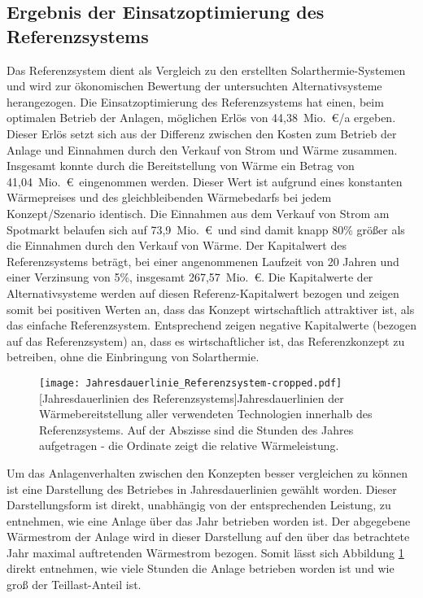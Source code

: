\subsection{Ergebnis der Einsatzoptimierung des Referenzsystems} 
Das Referenzsystem dient als Vergleich zu den erstellten Solarthermie-Systemen und wird zur ökonomischen Bewertung der untersuchten Alternativsysteme herangezogen. Die Einsatzoptimierung des Referenzsystems hat einen, beim optimalen Betrieb der Anlagen, möglichen Erlös von 44,38~Mio.~\euro/a ergeben. Dieser Erlös setzt sich aus der Differenz zwischen den Kosten zum Betrieb der Anlage und Einnahmen durch den Verkauf von Strom und Wärme zusammen. Insgesamt konnte durch die Bereitstellung von Wärme ein Betrag von 41,04~Mio.~\euro\ eingenommen werden. Dieser Wert ist aufgrund eines konstanten Wärmepreises und des gleichbleibenden Wärmebedarfs bei jedem Konzept/Szenario identisch. Die Einnahmen aus dem Verkauf von Strom am Spotmarkt belaufen sich auf 73,9~Mio.~\euro\ und sind damit knapp 80\% größer als die Einnahmen durch den Verkauf von Wärme. Der Kapitalwert des Referenzsystems beträgt, bei einer angenommenen Laufzeit von 20 Jahren und einer Verzinsung von 5\%, insgesamt 267,57~Mio.~\euro. Die Kapitalwerte der Alternativsysteme werden auf diesen Referenz-Kapitalwert bezogen und zeigen somit bei positiven Werten an, dass das Konzept wirtschaftlich attraktiver ist, als das einfache Referenzsystem. Entsprechend zeigen negative Kapitalwerte (bezogen auf das Referenzsystem) an, dass es wirtschaftlicher ist, das Referenzkonzept zu betreiben, ohne die Einbringung von Solarthermie.

	\begin{figure}[ht]
		\centering
		\texttt{[image: Jahresdauerlinie\_Referenzsystem-cropped.pdf]}
		[Jahresdauerlinien des Referenzsystems]{Jahresdauerlinien der Wärmebereitstellung aller verwendeten Technologien innerhalb des Referenzsystems. Auf der Abszisse sind die Stunden des Jahres aufgetragen - die Ordinate zeigt die relative Wärmeleistung.}
		\label{figure: Jahresdauerlinien_Referenzsystem}
	\end{figure}

Um das Anlagenverhalten zwischen den Konzepten besser vergleichen zu können ist eine Darstellung des Betriebes in Jahresdauerlinien gewählt worden. Dieser Darstellungsform ist direkt, unabhängig von der entsprechenden Leistung, zu entnehmen, wie eine Anlage über das Jahr betrieben worden ist. Der abgegebene Wärmestrom der Anlage wird in dieser Darstellung auf den über das betrachtete Jahr maximal auftretenden Wärmestrom bezogen. Somit lässt sich Abbildung \ref{figure: Jahresdauerlinien_Referenzsystem} direkt entnehmen, wie viele Stunden die Anlage betrieben worden ist und wie groß der Teillast-Anteil ist.

